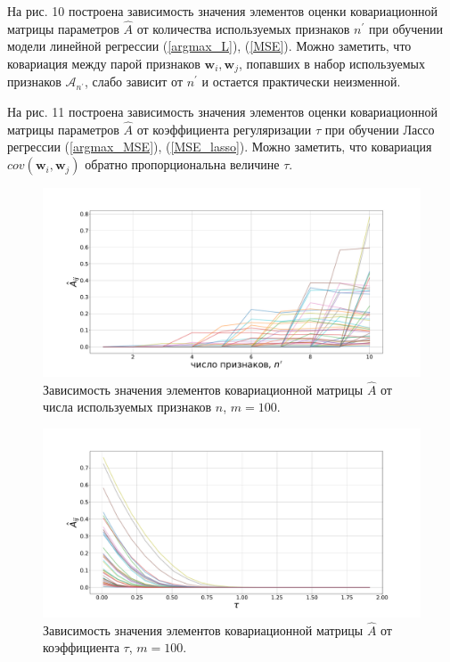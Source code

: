 \documentclass[12pt,twoside]{article}
\begin{document}
На рис. 10 построена зависимость значения элементов оценки ковариационной матрицы параметров $\hat{A}$ от количества используемых признаков $n^{\prime}$ при обучении модели линейной регрессии (\ref{argmax_L}), (\ref{MSE}). Можно заметить, что ковариация между парой признаков $\mathbf{w}_i, \mathbf{w}_j$, попавших в набор используемых признаков $\mathcal{A}_{n^{\prime}}$, слабо зависит от $n^{\prime}$ и остается практически неизменной.

На рис. 11 построена зависимость значения элементов оценки ковариационной матрицы параметров $\hat{A}$ от коэффициента регуляризации $\tau$ при обучении Лассо регрессии (\ref{argmax_MSE}), (\ref{MSE_lasso}). Можно заметить, что ковариация $cov(\mathbf{w}_i, \mathbf{w}_j)$ обратно пропорциональна величине $\tau$.

\begin{figure}[h!t]\center
\includegraphics[width=1\textwidth]{../data/pics/synthetic_W_from_N.pdf}
\caption{Зависимость значения элементов ковариационной матрицы $\hat{A}$ от числа используемых признаков $n$, $m = 100$.}
\label{fig9}
\end{figure}

\begin{figure}[h!t]\center
\includegraphics[width=1\textwidth]{../data/pics/synthetic_W_from_tau.pdf}
\caption{Зависимость значения элементов ковариационной матрицы $\hat{A}$ от коэффициента $\tau$, $m = 100$.}
\label{fig10}
\end{figure}
\end{document}
